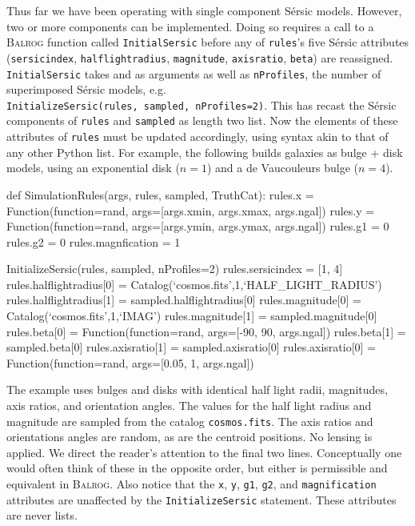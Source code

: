 \documentclass[11pt]{book}
\newcommand{\codett}[1]{\lstinline{#1}}
\newcommand{\py}{Python}
\newcommand{\balrog}{\textsc{Balrog}}
\newcommand{\sersic}{S\'{e}rsic}
\begin{document}
Thus far we have been operating with single component \sersic{} models.
However, two or more components can be implemented.
Doing so requires a call to a \balrog{} function called \codett{InitialSersic}
before any of \codett{rules}'s five \sersic{} attributes 
(\codett{sersicindex}, \codett{halflightradius}, \codett{magnitude}, \codett{axisratio}, \codett{beta})
are reassigned.
\codett{InitialSersic} takes \simrules{} and \simsamp{} as arguments as well as \codett{nProfiles},
the number of superimposed \sersic{} models, e.g.\\
\codett{InitializeSersic(rules, sampled, nProfiles=2)}.
This has recast the \sersic{} components of \codett{rules} and \codett{sampled} as length two list.
Now the elements of these attributes of \codett{rules} must be updated accordingly,
using syntax akin to that of any other \py{} list. For example, the following builds
galaxies as bulge + disk models, using an exponential disk ($n = 1$) and a de Vaucouleurs bulge ($n = 4$).

\begin{code}
def SimulationRules(args, rules, sampled, TruthCat):
    rules.x = Function(function=rand, args=[args.xmin, args.xmax, args.ngal])
    rules.y = Function(function=rand, args=[args.ymin, args.ymax, args.ngal])
    rules.g1 = 0
    rules.g2 = 0
    rules.magnfication = 1

    InitializeSersic(rules, sampled, nProfiles=2)
    rules.sersicindex = [1, 4]
    rules.halflightradius[0] = Catalog(`cosmos.fits',1,`HALF_LIGHT_RADIUS')
    rules.halflightradius[1] = sampled.halflightradius[0]
    rules.magnitude[0] = Catalog(`cosmos.fits',1,`IMAG')
    rules.magnitude[1] = sampled.magnitude[0]
    rules.beta[0] = Function(function=rand, args=[-90, 90, args.ngal])
    rules.beta[1] = sampled.beta[0]
    rules.axisratio[1] = sampled.axisratio[0]
    rules.axisratio[0] = Function(function=rand, args=[0.05, 1, args.ngal])
\end{code}

\noindent The example uses bulges and disks with identical half light radii,
magnitudes, axis ratios, and orientation angles.
The values for the half light radius and magnitude are sampled from the catalog \codett{cosmos.fits}.
The axis ratios and orientations angles are random, as are the centroid positions.
No lensing is applied.
We direct the reader's attention to the final two lines.
Conceptually one would often think of these in the opposite order, but either is permissible 
and equivalent in \balrog{}.
Also notice that the \codett{x}, \codett{y}, \codett{g1}, \codett{g2}, and \codett{magnification}
attributes are unaffected by the \codett{InitializeSersic} statement. These attributes are never lists.
\end{document}

